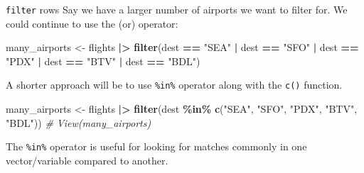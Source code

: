 \documentclass[
  ignorenonframetext,
]{beamer}
\newenvironment{Shaded}{\begin{snugshade}}{\end{snugshade}}
\newcommand{\CommentTok}[1]{\textcolor[rgb]{0.56,0.35,0.01}{\textit{#1}}}
\newcommand{\FunctionTok}[1]{\textcolor[rgb]{0.13,0.29,0.53}{\textbf{#1}}}
\newcommand{\NormalTok}[1]{#1}
\newcommand{\OtherTok}[1]{\textcolor[rgb]{0.56,0.35,0.01}{#1}}
\newcommand{\SpecialCharTok}[1]{\textcolor[rgb]{0.81,0.36,0.00}{\textbf{#1}}}
\newcommand{\StringTok}[1]{\textcolor[rgb]{0.31,0.60,0.02}{#1}}
\begin{document}
\begin{frame}[fragile]{\texttt{filter} rows}
\protect\hypertarget{filter-rows-5}{}
Say we have a larger number of airports we want to filter for. We could
continue to use the \texttt{\textbar{}} (or) operator:

\normalsize

\begin{Shaded}
\begin{Highlighting}[]
\NormalTok{many\_airports }\OtherTok{\textless{}{-}}\NormalTok{ flights }\SpecialCharTok{|\textgreater{}} 
  \FunctionTok{filter}\NormalTok{(dest }\SpecialCharTok{==} \StringTok{"SEA"} \SpecialCharTok{|}\NormalTok{ dest }\SpecialCharTok{==} \StringTok{"SFO"} \SpecialCharTok{|}\NormalTok{ dest }\SpecialCharTok{==} \StringTok{"PDX"} \SpecialCharTok{|} 
\NormalTok{         dest }\SpecialCharTok{==} \StringTok{"BTV"} \SpecialCharTok{|}\NormalTok{ dest }\SpecialCharTok{==} \StringTok{"BDL"}\NormalTok{)}
\end{Highlighting}
\end{Shaded}

\normalsize

A shorter approach will be to use \texttt{\%in\%} operator along with
the \texttt{c()} function.

\normalsize

\begin{Shaded}
\begin{Highlighting}[]
\NormalTok{many\_airports }\OtherTok{\textless{}{-}}\NormalTok{ flights }\SpecialCharTok{|\textgreater{}} 
  \FunctionTok{filter}\NormalTok{(dest }\SpecialCharTok{\%in\%} \FunctionTok{c}\NormalTok{(}\StringTok{"SEA"}\NormalTok{, }\StringTok{"SFO"}\NormalTok{, }\StringTok{"PDX"}\NormalTok{, }\StringTok{"BTV"}\NormalTok{, }\StringTok{"BDL"}\NormalTok{))}
\CommentTok{\# View(many\_airports)}
\end{Highlighting}
\end{Shaded}

\normalsize

The \texttt{\%in\%} operator is useful for looking for matches commonly
in one vector/variable compared to another.
\end{frame}
\end{document}
